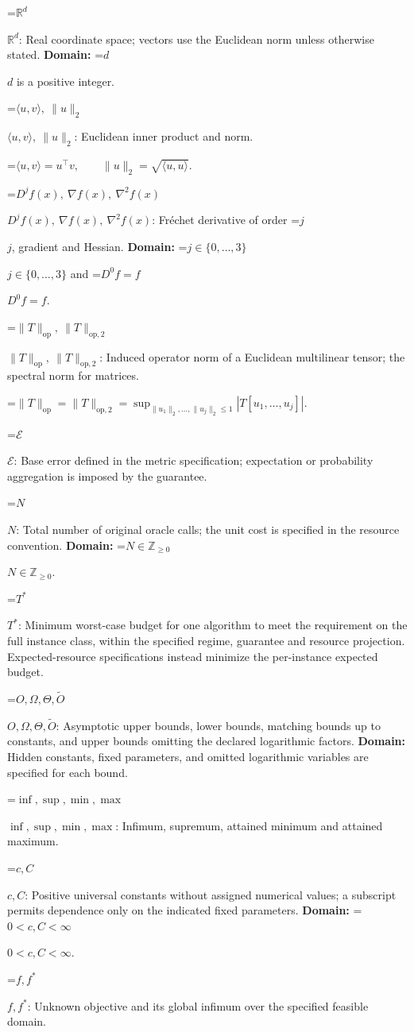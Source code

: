 \documentclass[10pt,a4paper]{article}
\newcommand{\AtlasMath}[1]{\par\begingroup\centering\setbox0=\hbox{$\displaystyle #1$}\ifdim\wd0>1.4\linewidth\typeout{ATLAS WIDE FORMULA: \the\wd0}\fi\ifdim\wd0>\linewidth\resizebox{\linewidth}{!}{\box0}\else\box0\fi\par\endgroup}
\newcommand{\AtlasInlineMath}[1]{\begingroup\setbox0=\hbox{$#1$}\ifdim\wd0>.4\linewidth\endgroup\AtlasMath{#1}\else\endgroup$#1$\fi}
\begin{document}
\AtlasInlineMath{\mathbb{R}^d}: Real coordinate space; vectors use the Euclidean norm unless otherwise stated. \textbf{Domain:} \AtlasInlineMath{d} is a positive integer.

\AtlasInlineMath{\langle u,v\rangle,\ \|u\|_2}: Euclidean inner product and norm.


\AtlasMath{\langle u,v\rangle=u^\top v,\qquad\|u\|_2=\sqrt{\langle u,u\rangle}.}


\AtlasInlineMath{D^jf(x),\ \nabla f(x),\ \nabla^2f(x)}: Fréchet derivative of order \AtlasInlineMath{j}, gradient and Hessian. \textbf{Domain:} \AtlasInlineMath{j\in\{0,\ldots,3\}} and \AtlasInlineMath{D^0f=f}.

\AtlasInlineMath{\|T\|_{\mathrm{op}},\ \|T\|_{\mathrm{op},2}}: Induced operator norm of a Euclidean multilinear tensor; the spectral norm for matrices.


\AtlasMath{\|T\|_{\mathrm{op}}=\|T\|_{\mathrm{op},2}=\sup_{\|u_1\|_2,\ldots,\|u_j\|_2\le1}|T[u_1,\ldots,u_j]|.}


\AtlasInlineMath{\mathcal{E}}: Base error defined in the metric specification; expectation or probability aggregation is imposed by the guarantee.

\AtlasInlineMath{N}: Total number of original oracle calls; the unit cost is specified in the resource convention. \textbf{Domain:} \AtlasInlineMath{N\in\mathbb{Z}_{\ge0}}.

\AtlasInlineMath{T^*}: Minimum worst-case budget for one algorithm to meet the requirement on the full instance class, within the specified regime, guarantee and resource projection. Expected-resource specifications instead minimize the per-instance expected budget.

\AtlasInlineMath{O,\Omega,\Theta,\widetilde{O}}: Asymptotic upper bounds, lower bounds, matching bounds up to constants, and upper bounds omitting the declared logarithmic factors. \textbf{Domain:} Hidden constants, fixed parameters, and omitted logarithmic variables are specified for each bound.

\AtlasInlineMath{\inf,\sup,\min,\max}: Infimum, supremum, attained minimum and attained maximum.

\AtlasInlineMath{c,C}: Positive universal constants without assigned numerical values; a subscript permits dependence only on the indicated fixed parameters. \textbf{Domain:} \AtlasInlineMath{0<c,C<\infty}.

\AtlasInlineMath{f,f^*}: Unknown objective and its global infimum over the specified feasible domain.
\end{document}
